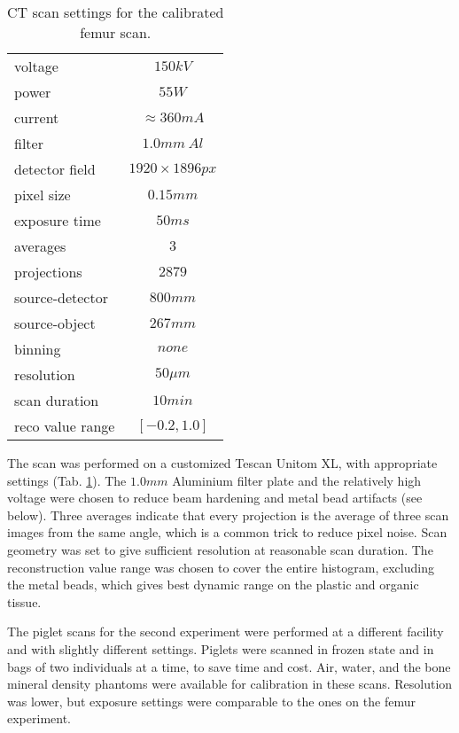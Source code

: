 \begin{table}[htbp]
\caption{\label{tab:ct_settings}CT scan settings for the calibrated femur scan.}
\centering
\begin{tabular}{|l|c|}
\hline
voltage & \(150 kV\)\\[0pt]
power & \(55 W\)\\[0pt]
current & \(\approx 360 mA\)\\[0pt]
filter & \(1.0 mm\ Al\)\\[0pt]
detector field & \(1920\times 1896 px\)\\[0pt]
pixel size & \(0.15 mm\)\\[0pt]
exposure time & \(50 ms\)\\[0pt]
averages & \(3\)\\[0pt]
projections & \(2879\)\\[0pt]
source-detector & \(800 mm\)\\[0pt]
source-object & \(267 mm\)\\[0pt]
binning & \(none\)\\[0pt]
resolution & \(50 \mu m\)\\[0pt]
scan duration & \(10 min\)\\[0pt]
reco value range & \([-0.2, 1.0]\)\\[0pt]
\hline
\end{tabular}
\end{table}

The scan was performed on a customized Tescan Unitom XL, with appropriate settings (Tab. \ref{tab:ct_settings}).
The \(1.0 mm\) Aluminium filter plate and the relatively high voltage were chosen to reduce beam hardening and metal bead artifacts (see below).
Three averages indicate that every projection is the average of three scan images from the same angle, which is a common trick to reduce pixel noise.
Scan geometry was set to give sufficient resolution at reasonable scan duration.
The reconstruction value range was chosen to cover the entire histogram, excluding the metal beads, which gives best dynamic range on the plastic and organic tissue.


The piglet scans for the second experiment were performed at a different facility and with slightly different settings.
Piglets were scanned in frozen state and in bags of two individuals at a time, to save time and cost.
Air, water, and the bone mineral density phantoms were available for calibration in these scans.
Resolution was lower, but exposure settings were comparable to the ones on the femur experiment.


